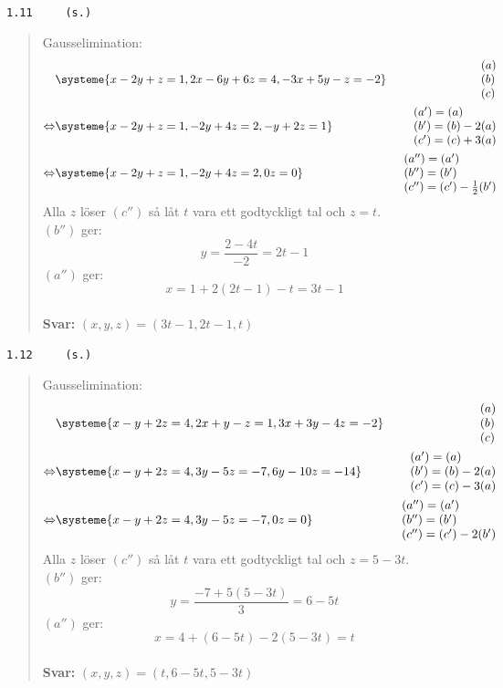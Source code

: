 \documentclass[a4paper]{article}
\newcommand{\tskcol}[1]{\textcolor{tskcol}{#1}}
\begin{document}
\pagebreak
\texttt{\tskcol{1.11~~~~ (s.)}}
\begin{quotation}
	\noindent
	Gausselimination:
	\begin{align*}
	&\systeme{
		  x-2y+ z=1,
		 2x-6y+6z=4,
		-3x+5y- z=-2}  
	&\begin{array}{l} 
	(a) \\ 
	(b) \\
	(c) 
	\end{array} \\ \Leftrightarrow
	&\systeme{
		x-2y+ z=1,
		 -2y+4z=2,
		 - y+2z=1}  
	&\begin{array}{l} 
	(a')=(a) \\ 
	(b')=(b)-2(a) \\
	(c')=(c)+3(a)
	\end{array} \\ \Leftrightarrow
	&\systeme{
		x-2y+ z=1,
		 -2y+4z=2,
		     0z=0} 
	&\begin{array}{l} 
	(a'')=(a') \\ 
	(b'')=(b') \\
	(c'')=(c')-\frac{1}{2}(b')
	\end{array}
	\end{align*}
	Alla $z$ löser $(c'')$ så låt $t$ vara ett godtyckligt tal och $z= t$. \\
	$(b'')$ ger:
	\[y=\frac{2-4t}{-2}=2t-1\]
	$(a'')$ ger:
	\[x=1+2(2t-1)-t=3t-1\]
	\\
	\textbf{Svar:} $(x,y,z)=(3t-1,2t-1,t)$
\end{quotation}

\texttt{\tskcol{1.12~~~~ (s.)}}
\begin{quotation}
	\noindent
	Gausselimination:
	\begin{align*}
	&\systeme{
		 x- y+2z=4,
		2x+ y- z=1,
		3x+3y-4z=-2}  
	&\begin{array}{l} 
	(a) \\ 
	(b) \\
	(c) 
	\end{array} \\ \Leftrightarrow
	&\systeme{
		 x- y+ 2z=4,
		   3y- 5z=-7,
		   6y-10z=-14}  
	&\begin{array}{l} 
	(a')=(a) \\ 
	(b')=(b)-2(a) \\
	(c')=(c)-3(a)
	\end{array} \\ \Leftrightarrow
	&\systeme{
		x- y+2z=4,
		  3y-5z=-7,
		     0z=0} 
	&\begin{array}{l} 
	(a'')=(a') \\ 
	(b'')=(b') \\
	(c'')=(c')-2(b')
	\end{array}
	\end{align*}
	Alla $z$ löser $(c'')$ så låt $t$ vara ett godtyckligt tal och $z=5-3t$. \\
	$(b'')$ ger:
	\[y=\frac{-7+5(5-3t)}{3}=6-5t\]
	$(a'')$ ger:
	\[x=4+(6-5t)-2(5-3t)=t\]
	\\
	\textbf{Svar:} $(x,y,z)=(t,6-5t,5-3t)$
\end{quotation}
\end{document}
